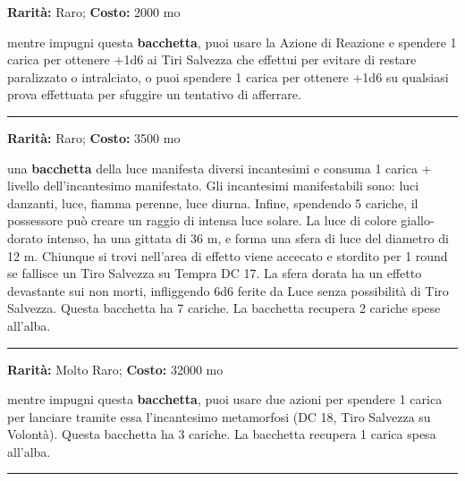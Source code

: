 \begin{multicols}{2}
\textbf{Rarità:} Raro; \textbf{Costo:} 2000 mo

mentre impugni questa \textbf{bacchetta}, puoi usare la Azione di Reazione e spendere 1 carica per ottenere +1d6 ai Tiri Salvezza che effettui per evitare di restare paralizzato o intralciato, o puoi spendere 1 carica per ottenere +1d6 su qualsiasi prova effettuata per sfuggire un tentativo di afferrare.

\smallskip\noindent\rule{\linewidth}{2pt}  \hypertarget{BacchettadellaLuce}{}\medskip{}\noindent\label{BacchettadellaLuce}

\textbf{Rarità:} Raro; \textbf{Costo:} 3500 mo

una \textbf{bacchetta} della luce manifesta diversi incantesimi e consuma 1 carica + livello dell'incantesimo manifestato. Gli incantesimi manifestabili sono: luci danzanti, luce, fiamma perenne, luce diurna. Infine, spendendo 5 cariche, il possessore può creare un raggio di intensa luce solare. La luce di colore giallo-dorato intenso, ha una gittata di 36 m, e forma una sfera di luce del diametro di 12 m. Chiunque si trovi nell'area di effetto viene accecato e stordito per 1 round se fallisce un Tiro Salvezza su Tempra DC 17. La sfera dorata ha un effetto devastante sui non morti, infliggendo 6d6 ferite da Luce senza possibilità di Tiro Salvezza. Questa bacchetta ha 7 cariche. La bacchetta recupera 2 cariche spese all'alba.

\smallskip\noindent\rule{\linewidth}{2pt}  \hypertarget{BacchettadellaMetamorfosi}{}\medskip{}\noindent\label{BacchettadellaMetamorfosi}

\textbf{Rarità:} Molto Raro; \textbf{Costo:} 32000 mo

mentre impugni questa \textbf{bacchetta}, puoi usare due azioni per spendere 1 carica per lanciare tramite essa l'incantesimo metamorfosi (DC 18, Tiro Salvezza su Volontà). Questa bacchetta ha 3 cariche. La bacchetta recupera 1 carica spesa all'alba.

\smallskip\noindent\rule{\linewidth}{2pt}  \hypertarget{BacchettadellaNegazione}{}\medskip{}\noindent\label{BacchettadellaNegazione}


\end{multicols}
